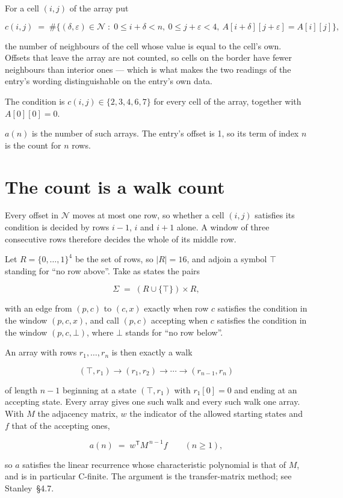 \documentclass[11pt]{article}
\theoremstyle{definition}
\begin{document}
For a cell $(i,j)$ of the array put

\[c(i,j) \;=\; \#\bigl\{(\delta,\varepsilon)\in\mathcal{N} \;:\; 0\le i+\delta<n,\ 0\le j+\varepsilon<4,\ A[i+\delta][j+\varepsilon] = A[i][j]\bigr\},\]

the number of neighbours of the cell whose value is equal to the cell's own. Offsets that leave the array are not counted, so cells on the border have fewer neighbours than interior ones --- which is what makes the two readings of the entry's wording distinguishable on the entry's own data.

The condition is $c(i,j) \in \{2, 3, 4, 6, 7\}$ for every cell of the array, together with $A[0][0]=0$.

$a(n)$ is the number of such arrays. The entry's offset is 1, so its term of index $n$ is the count for $n$ rows.

\section{The count is a walk count}

Every offset in $\mathcal{N}$ moves at most one row, so whether a cell $(i,j)$ satisfies its condition is decided by rows $i-1$, $i$ and $i+1$ alone. A window of three consecutive rows therefore decides the whole of its middle row.

Let $R = \{0,\dots,1\}^{4}$ be the set of rows, so $|R| = 16$, and adjoin a symbol $\top$ standing for ``no row above''. Take as states the pairs

\[\Sigma \;=\; (R \cup \{\top\}) \times R,\]

with an edge from $(p,c)$ to $(c,x)$ exactly when row $c$ satisfies the condition in the window $(p,c,x)$, and call $(p,c)$ accepting when $c$ satisfies the condition in the window $(p,c,\bot)$, where $\bot$ stands for ``no row below''.

An array with rows $r_1,\dots,r_n$ is then exactly a walk

\[(\top,r_1) \to (r_1,r_2) \to \cdots \to (r_{n-1},r_n)\]

of length $n-1$ beginning at a state $(\top,r_1)$ with $r_1[0]=0$ and ending at an accepting state. Every array gives one such walk and every such walk one array. With $M$ the adjacency matrix, $w$ the indicator of the allowed starting states and $f$ that of the accepting ones,

\[a(n) \;=\; w^{\mathsf T} M^{\,n-1} f \qquad (n \ge 1),\]

so $a$ satisfies the linear recurrence whose characteristic polynomial is that of $M$, and is in particular C-finite. The argument is the transfer-matrix method; see Stanley~\S4.7.
\end{document}
